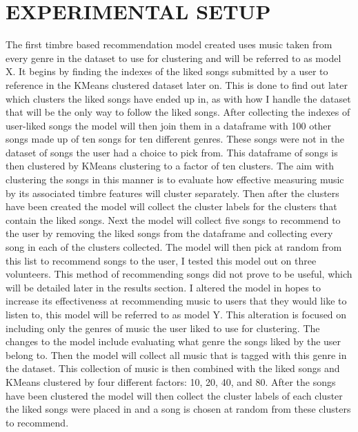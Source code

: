 \documentclass[letterpaper, 10 pt, conference]{ieeeconf}
\begin{document}

\section{EXPERIMENTAL SETUP}
The first timbre based recommendation model created uses music taken from every genre in the dataset to use for clustering and will be referred to as model X. It begins by finding the indexes of the liked songs submitted by a user to reference in the KMeans clustered dataset later on. This is done to find out later which clusters the liked songs have ended up in, as with how I handle the dataset that will be the only way to follow the liked songs. After collecting the indexes of user-liked songs the model will then join them in a dataframe with 100 other songs made up of ten songs for ten different genres. These songs were not in the dataset of songs the user had a choice to pick from. This dataframe of songs is then clustered by KMeans clustering to a factor of ten clusters. The aim with clustering the songs in this manner is to evaluate how effective measuring music by its associated timbre features will cluster separately. Then after the clusters have been created the model will collect the cluster labels for the clusters that contain the liked songs. Next the model will collect five songs to recommend to the user by removing the liked songs from the dataframe and collecting every song in each of the clusters collected. The model will then pick at random from this list to recommend songs to the user, I tested this model out on three volunteers. This method of recommending songs did not prove to be useful, which will be detailed later in the results section. I altered the model in hopes to increase its effectiveness at recommending music to users that they would like to listen to, this model will be referred to as model Y. This alteration is focused on including only the genres of music the user liked to use for clustering. The changes to the model include evaluating what genre the songs liked by the user belong to. Then the model will collect all music that is tagged with this genre in the dataset. This collection of music is then combined with the liked songs and KMeans clustered by four different factors: 10, 20, 40, and 80. After the songs have been clustered the model will then collect the cluster labels of each cluster the liked songs were placed in and a song is chosen at random from these clusters to recommend.
\end{document}
